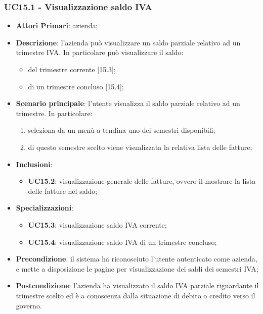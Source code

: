 \subsubsection{UC15.1 - Visualizzazione saldo IVA}
\begin{itemize}
	\item \textbf{Attori Primari}: azienda;
	\item \textbf{Descrizione}: l'azienda può visualizzare un saldo parziale relativo ad un trimestre IVA. In particolare può visualizzare il saldo:
	\begin{itemize}
		\item del trimestre corrente [15.3];
		\item di un trimestre concluso [15.4];
	\end{itemize}
	\item \textbf{Scenario principale}: l'utente visualizza il saldo parziale relativo ad un trimestre. In particolare:
	\begin{enumerate}[label=\alph*.]
		\item seleziona da un menù a tendina uno dei semestri disponibili;
		\item di questo semestre scelto viene visualizzata la relativa lista delle fatture; 
	\end{enumerate}
	\item \textbf{Inclusioni}: 
	\begin{itemize}
		\item \textbf{UC15.2}: visualizzazione generale delle fatture, ovvero il mostrare la lista delle fatture nel saldo;
	\end{itemize}
	\item \textbf{Specializzazioni}: 
	\begin{itemize}
		\item \textbf{UC15.3}: visualizzazione saldo IVA corrente;
		\item \textbf{UC15.4}:  visualizzazione saldo IVA di un trimestre concluso;
	\end{itemize}
	\item \textbf{Precondizione}: il sistema ha riconosciuto l'utente autenticato come azienda, e mette a disposizione le pagine per visualizzazione dei saldi dei semestri IVA;
	\item \textbf{Postcondizione}: l'azienda ha visualizzato il saldo IVA parziale riguardante il trimestre scelto ed è a conoscenza dalla situazione di debito o credito verso il governo.
\end{itemize} 
